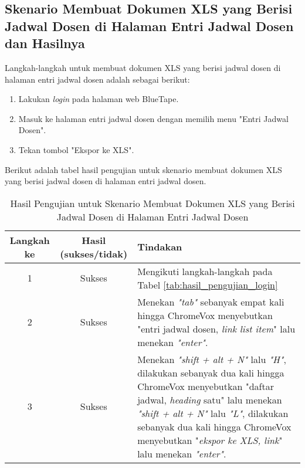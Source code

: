 \subsection{Skenario Membuat Dokumen XLS yang Berisi Jadwal Dosen di Halaman Entri Jadwal Dosen dan Hasilnya}
\label{subsec:skenario_membuat_dokumen_xls_yang_berisi_jadwal_dosen_di_halaman_entri_jadwal_dosen}
Langkah-langkah untuk membuat dokumen XLS yang berisi jadwal dosen di halaman entri jadwal dosen adalah sebagai berikut:

\begin{enumerate}
    \item Lakukan \textit{login} pada halaman web BlueTape.
    \item Masuk ke halaman entri jadwal dosen dengan memilih menu "Entri Jadwal Dosen".
    \item Tekan tombol "Ekspor ke XLS".
\end{enumerate}

Berikut adalah tabel hasil pengujian untuk skenario membuat dokumen XLS yang berisi jadwal dosen di halaman entri jadwal dosen.

\begin{table}[H]
    \centering 
    \caption{Hasil Pengujian untuk Skenario Membuat Dokumen XLS yang Berisi Jadwal Dosen di Halaman Entri Jadwal Dosen}
    \label{tab:hasil_pengujian_membuat_dokumen_xls_yang_berisi_jadwal_dosen_di_halaman_entri_jadwal_dosen}
    \begin{tabular}{|c|c|p{10cm}|}
        \toprule
        Langkah ke & Hasil (sukses/tidak) & Tindakan \\

        \midrule
        1 & Sukses & Mengikuti langkah-langkah pada Tabel \ref{tab:hasil_pengujian_login} \\
        2 & Sukses & Menekan \textit{"tab"} sebanyak empat kali hingga ChromeVox menyebutkan "entri jadwal dosen, \textit{link list item}" lalu menekan \textit{"enter"}. \\
        3 & Sukses & Menekan \textit{"shift + alt + N"} lalu \textit{"H"}, dilakukan sebanyak dua kali hingga ChromeVox menyebutkan "daftar jadwal, \textit{heading} satu" lalu menekan \textit{"shift + alt + N"} lalu \textit{"L"}, dilakukan sebanyak dua kali hingga ChromeVox menyebutkan "\textit{ekspor ke XLS, link}" lalu menekan \textit{"enter"}. \\

        \bottomrule

    \end{tabular}
\end{table}

